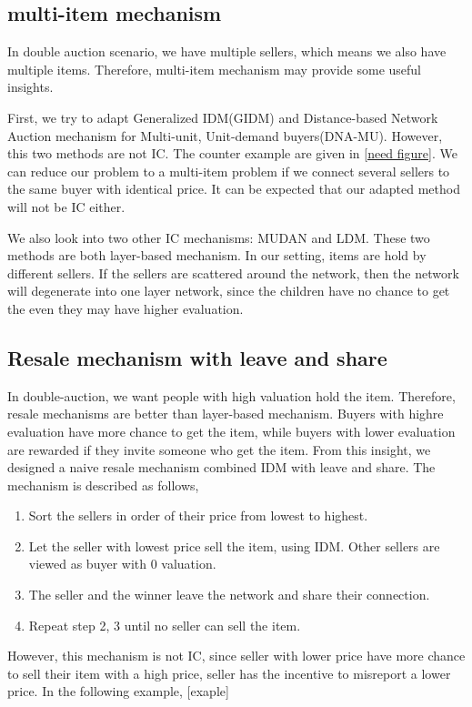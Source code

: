 \subsection{multi-item mechanism}
In double auction scenario, we have multiple sellers, which means we also have multiple items. Therefore,
multi-item mechanism may provide some useful insights.\par
First, we try to adapt Generalized IDM(GIDM) and Distance-based Network Auction mechanism for Multi-unit, Unit-demand buyers(DNA-MU).
However, this two methods are not IC. The counter example are given in \ref*{need figure}. We can reduce our problem to a multi-item problem if we connect several sellers to the same buyer with identical price. It can be expected that our
adapted method will not be IC either.\par
We also look into two other IC mechanisms: MUDAN and LDM. These two methods are both layer-based mechanism.
In our setting, items are hold by different sellers. If the sellers are scattered around the network, then the
network will degenerate into one layer network, since the children have no chance to get the even they may have higher
evaluation.
\subsection*{Resale mechanism with leave and share}
In double-auction, we want people with high valuation hold the item. Therefore, resale mechanisms are better than
layer-based mechanism. Buyers with highre evaluation have more chance to get the item, while buyers with lower
evaluation are rewarded if they invite someone who get the item. From this insight, we designed a naive
resale mechanism combined IDM with leave and share. The mechanism is described as follows,
\begin{enumerate}
  \item Sort the sellers in order of their price from lowest to highest.
  \item Let the seller with lowest price sell the item, using IDM. Other sellers are viewed as buyer with 0 valuation.
  \item The seller and the winner leave the network and share their connection.
  \item Repeat step 2, 3 until no seller can sell the item.
\end{enumerate}
However, this mechanism is not IC, since seller with lower price have more chance to sell their
item with a high price, seller has the incentive to misreport a lower price. In the following example,
[exaple]
